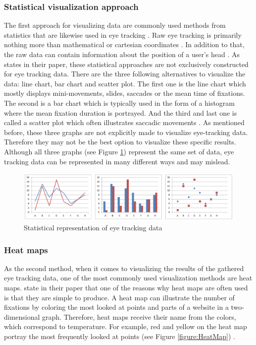 \subsubsection{Statistical visualization approach}
The first approach for visualizing data are commonly used methods from statistics that are likewise used in eye tracking \autocite{blascheck2014state}. Raw eye tracking is primarily nothing more than mathematical or cartesian coordinates \autocite{blascheck2014state, biedert2010eyebook}. In addition to that, the raw data can contain information about the position of a user's head \autocite[]{biedert2010eyebook}. 
As \textcite[]{blascheck2014state} states in their paper, these statistical approaches are not exclusively constructed for eye tracking data. There are the three following alternatives to visualize the data: line chart, bar chart and scatter plot. The first one is the line chart which mostly displays mini-movements, slides, saccades or the mean time of fixations. The second is a bar chart which is typically used in the form of a histogram where the mean fixation duration is portrayed. And the third and last one is called a scatter plot which often illustrates saccadic movements \autocite[]{blascheck2014state}.
As mentioned before, these three graphs are not explicitly made to visualize eye-tracking data. Therefore they may not be the best option to visualize these specific results.  Although all three graphs (see Figure \ref{figure:Statistics}) represent the same set of data, eye tracking data can be represented in many different ways and may mislead. 

\begin{figure}[!ht]
    \centering
    \includegraphics[width=1\linewidth]{images/statistics_blascheck2014state.png}
    \caption{
       Statistical representation of eye tracking data \autocite[7]{blascheck2014state}
    }
    \label{figure:Statistics}
\end{figure}

\subsubsection{Heat maps}
As the second method, when it comes to visualizing the results of the gathered eye tracking data, one of the most commonly used visualization methods are heat maps. 
\textcite{bojko2009informative} state in their paper that one of the reasons why heat maps are often used is that they are simple to produce. 
A heat map can illustrate the number of fixations by coloring the most looked at points and parts of a website in a two-dimensional graph. Therefore, heat maps receive their name from the colors, which correspond to temperature. For example, red and yellow on the heat map portray the most frequently looked at points (see Figure \ref{figure:HeatMap}) \autocite[]{bojko2009informative}. 

